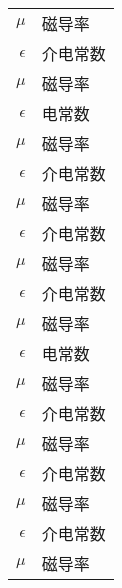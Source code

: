 \begin{nomenclature*}
\begin{longtable}{rl}
  $\mu$         & 磁导率 \\
  $\epsilon$    & 介电常数 \\
  $\mu$         & 磁导率 \\
  $\epsilon$    & 电常数 \\
  $\mu$         & 磁导率 \\
  $\epsilon$    & 介电常数 \\
  $\mu$         & 磁导率 \\
  $\epsilon$    & 介电常数 \\
  $\mu$         & 磁导率 \\
  $\epsilon$    & 介电常数 \\
  $\mu$         & 磁导率 \\
  $\epsilon$    & 电常数 \\
  $\mu$         & 磁导率 \\
  $\epsilon$    & 介电常数 \\
  $\mu$         & 磁导率 \\
  $\epsilon$    & 介电常数 \\
  $\mu$         & 磁导率 \\
  $\epsilon$    & 介电常数 \\
  $\mu$         & 磁导率 \\
\end{longtable}

\end{nomenclature*}
